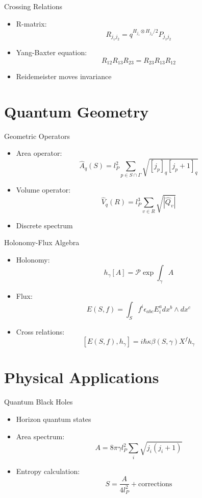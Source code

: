 \documentclass{beamer}
\begin{document}
\begin{frame}{Crossing Relations}
\begin{itemize}
\item R-matrix:
\[
R_{j_1j_2} = q^{H_{j_1} \otimes H_{j_2}/2}P_{j_1j_2}
\]
\item Yang-Baxter equation:
\[
R_{12}R_{13}R_{23} = R_{23}R_{13}R_{12}
\]
\item Reidemeister moves invariance
\end{itemize}
\end{frame}

\section{Quantum Geometry}
\begin{frame}{Geometric Operators}
\begin{itemize}
\item Area operator:
\[
\hat{A}_q(S) = l_P^2 \sum_{p \in S \cap \Gamma} \sqrt{[j_p]_q[j_p+1]_q}
\]
\item Volume operator:
\[
\hat{V}_q(R) = l_P^3 \sum_{v \in R} \sqrt{|\hat{Q}_v|}
\]
\item Discrete spectrum
\end{itemize}
\end{frame}

\begin{frame}{Holonomy-Flux Algebra}
\begin{itemize}
\item Holonomy:
\[
h_{\gamma}[A] = \mathcal{P}\exp\int_{\gamma} A
\]
\item Flux:
\[
E(S,f) = \int_S f^i\epsilon_{abc}E^a_idx^b\wedge dx^c
\]
\item Cross relations:
\[
[E(S,f), h_\gamma] = i\hbar\kappa\beta(S,\gamma)X^f h_\gamma
\]
\end{itemize}
\end{frame}

\section{Physical Applications}
\begin{frame}{Quantum Black Holes}
\begin{itemize}
\item Horizon quantum states
\item Area spectrum:
\[
A = 8\pi\gamma l_P^2\sum_i\sqrt{j_i(j_i+1)}
\]
\item Entropy calculation:
\[
S = \frac{A}{4l_P^2} + \text{corrections}
\]
\end{itemize}
\end{frame}
\end{document}
